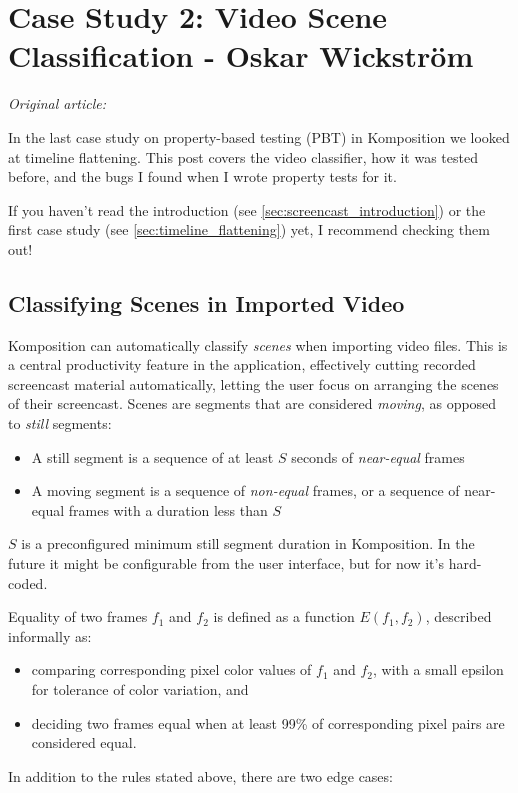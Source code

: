 \chapter{Case Study 2: Video Scene Classification - Oskar Wickstr\"om}
\label{sec:video_scene_classification}

\vspace{\baselineskip}
\noindent\textit{Original article: \cite{video_scene_classification}}
\vspace{\baselineskip}

\noindent In the last case study on property-based testing (PBT) in Komposition we looked at timeline flattening. This post covers the video classifier, how it was tested before, and the bugs I found when I wrote property tests for it.

If you haven't read the introduction (see \ref{sec:screencast_introduction}) or the first case study (see \ref{sec:timeline_flattening}) yet, I recommend checking them out!

\section{Classifying Scenes in Imported Video}


Komposition can automatically classify \textit{scenes} when importing video files. This is a central productivity feature in the application, effectively cutting recorded screencast material automatically, letting the user focus on arranging the scenes of their screencast. Scenes are segments that are considered \textit{moving}, as opposed to \textit{still} segments:

\begin{itemize}
\item A still segment is a sequence of at least $S$ seconds of \textit{near-equal} frames
\item A moving segment is a sequence of \textit{non-equal} frames, or a sequence of near-equal frames with a duration less than $S$
\end{itemize}
$S$ is a preconfigured minimum still segment duration in Komposition. In the future it might be configurable from the user interface, but for now it's hard-coded.

Equality of two frames $f_1$ and $f_2$ is defined as a function $E(f_1,f_2)$, described informally as:

\begin{itemize}
\item comparing corresponding pixel color values of $f_1$  and $f_2$, with a small epsilon for tolerance of color variation, and
\item deciding two frames equal when at least 99\% of corresponding pixel pairs are considered equal.                                                                                              \end{itemize}
In addition to the rules stated above, there are two edge cases:

